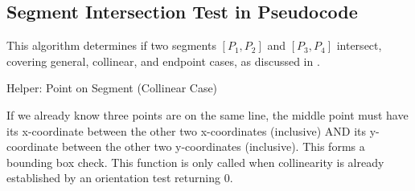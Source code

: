 \subsection{Segment Intersection Test in Pseudocode}
\label{ssec:A.2.4}

This algorithm determines if two segments $[P_1,P_2]$ and $[P_3,P_4]$ intersect, covering general, collinear, and endpoint cases, as discussed in .

\begin{algorithm}[H]
\caption{Helper: Point on Segment (Collinear Case)}
\label{alg:A.2.4.point_on_segment_collinear}
\end{algorithm}
\begin{intuition}
\label{intuition:A.2.4.point_on_segment_collinear}
If we already know three points are on the same line, the middle point must have its x-coordinate between the other two x-coordinates (inclusive) AND its y-coordinate between the other two y-coordinates (inclusive). This forms a bounding box check.
This function is only called when collinearity is already established by an orientation test returning 0.
\end{intuition}

